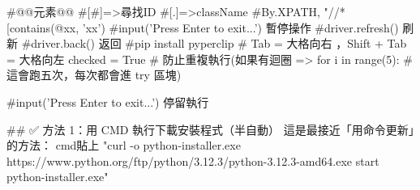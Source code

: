 #@@元素@@
#[#]=>尋找ID   
#[.]=>className
#By.XPATH, "//*[contains(@xx, 'xx')
#input('Press Enter to exit...') 暫停操作
#driver.refresh() 刷新
#driver.back() 返回
#pip install pyperclip
# Tab = 大格向右 ，Shift + Tab = 大格向左
checked = True  # 防止重複執行(如果有迴圈 => for i in range(5):  # 這會跑五次，每次都會進 try 區塊)

#input('Press Enter to exit...') 停留執行 

##
✅ 方法 1：用 CMD 執行下載安裝程式（半自動）
這是最接近「用命令更新」的方法：
cmd貼上
"curl -o python-installer.exe https://www.python.org/ftp/python/3.12.3/python-3.12.3-amd64.exe
start python-installer.exe"